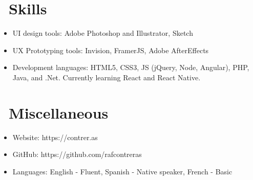 \documentclass{resume}
\begin{document}
\section{\faCogs\ Skills}
\begin{itemize}[parsep=0.5ex]
  \item UI design tools: Adobe Photoshop and Illustrator, Sketch
  \item UX Prototyping tools: Invision, FramerJS, Adobe AfterEffects
  \item Development languages: HTML5, CSS3, JS (jQuery, Node, Angular), PHP, Java, and .Net. Currently learning React and React Native.
\end{itemize}

\section{\faInfo\ Miscellaneous}
\begin{itemize}[parsep=0.5ex]
  \item Website: https://contrer.as
  \item GitHub: https://github.com/rafcontreras
  \item Languages: English - Fluent, Spanish - Native speaker, French - Basic
\end{itemize}

%
%
\end{document}
